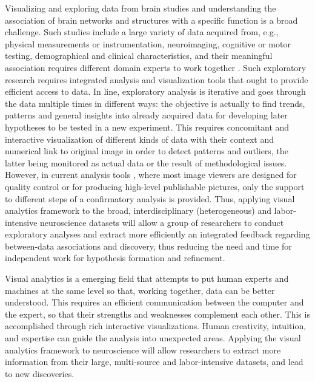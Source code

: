 \documentclass[utf8,paper]{frontiersSCNS} %
\begin{document}
Visualizing and exploring data from brain studies and understanding the association of brain networks and structures with a specific function is a broad challenge. Such studies include a large variety of data acquired from, e.g., physical measurements or instrumentation, neuroimaging, cognitive or motor testing, demographical and clinical characteristics, and their meaningful association requires different domain experts to work together . Such exploratory research requires integrated analysis and visualization tools that ought to provide efficient access to data. In line, exploratory analysis is iterative and goes through the data multiple times in different ways: the objective is actually to find trends, patterns and general insights into already acquired data for developing later hypotheses to be tested in a new experiment. This requires concomitant and interactive visualization of different kinds of data with their context and numerical link to original image in order to detect patterns and outliers, the latter being monitored as actual data or the result of methodological issues. However, in current analysis tools  , where most image viewers are designed for quality control or for producing high-level publishable pictures, only the support to different steps of a confirmatory analysis is provided. Thus, applying visual analytics framework to the broad, interdisciplinary (heterogeneous) and labor-intensive neuroscience datasets will allow a group of researchers to conduct exploratory analyses and extract more efficiently an integrated feedback regarding between-data associations and discovery, thus reducing the need and time for independent work for hypothesis formation and refinement.

Visual analytics\citep{cook_illuminating_2005} is a emerging field that attempts to put human experts and machines at the same level so that, working together, data can be better understood. This requires an efficient communication between the computer and the expert, so that their strengths and weaknesses complement each other. This is accomplished through rich interactive visualizations. Human creativity, intuition, and expertise can guide the analysis into unexpected areas. Applying the visual analytics framework to neuroscience will allow researchers to extract more information from their large, multi-source and labor-intensive datasets, and lead to new discoveries.
\end{document}
